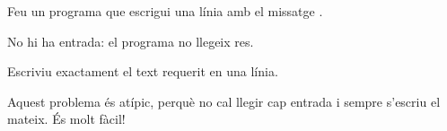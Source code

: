 
\Statement

Feu un programa que escrigui una línia amb el missatge .

\Input

No hi ha entrada: el programa no llegeix res.

\Output

Escriviu exactament el text requerit en una línia.

\Observation

Aquest problema és atípic, perquè no cal llegir cap entrada i sempre
s'escriu el mateix. És molt fàcil!

\Sample
